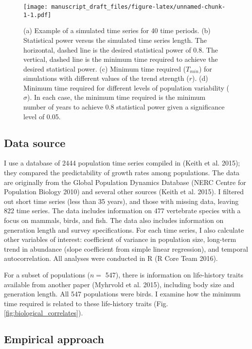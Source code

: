 \documentclass[12pt,]{article}
\begin{document}
\begin{spacing}{2}
\begin{figure}[htbp]
\centering
\texttt{[image: manuscript\_draft\_files/figure-latex/unnamed-chunk-1-1.pdf]}
\caption{(a) Example of a simulated time series for 40 time periods. (b)
Statistical power versus the simulated time series length. The
horizontal, dashed line is the desired statistical power of 0.8. The
vertical, dashed line is the minimum time required to achieve the
desired statistical power. (c) Minimum time required (\(T_{min}\)) for
simulations with different values of the trend strength (\(r\)). (d)
Minimum time required for different levels of population variability
(\(\sigma\)). In each case, the minimum time required is the minimum
number of years to achieve 0.8 statistical power given a significance
level of 0.05.\label{fig:theoretical_approach}}
\end{figure}

\subsection{Data source}\label{data-source}

I use a database of 2444 population time series compiled in (Keith et
al. 2015); they compared the predictability of growth rates among
populations. The data are originally from the Global Population Dynamics
Database (NERC Centre for Population Biology 2010) and several other
sources (Keith et al. 2015). I filtered out short time series (less than
35 years), and those with missing data, leaving 822 time series. The
data includes information on 477 vertebrate species with a focus on
mammals, birds, and fish. The data also includes information on
generation length and survey specifications. For each time series, I
also calculate other variables of interest: coefficient of variance in
population size, long-term trend in abundance (slope coefficient from
simple linear regression), and temporal autocorrelation. All analyses
were conducted in R (R Core Team 2016).

For a subset of populations (\(n =\) 547), there is information on
life-history traits available from another paper (Myhrvold et al. 2015),
including body size and generation length. All 547 populations were
birds. I examine how the minimum time required is related to these
life-history traits (Fig. \ref{fig:biological_correlates}).

\subsection{Empirical approach}\label{empirical-approach}


\end{spacing}
\end{document}
